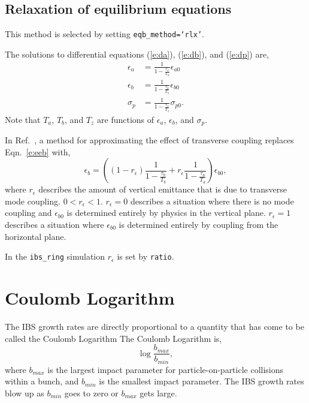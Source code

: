 \documentclass[11pt]{article}
\begin{document}
\subsection{Relaxation of equilibrium equations}
\label{ss:rlx}

This method is selected by setting {\tt eqb_method=`rlx'}.

The solutions to differential equations (\ref{e:da}), (\ref{e:db}), and (\ref{e:dp}) are,
\begin{align}
\epsilon_a&=\frac{1}{1-\frac{\tau_a}{T_a}}\epsilon_{a0}\label{e:eea}\\
\epsilon_b&=\frac{1}{1-\frac{\tau_b}{T_b}}\epsilon_{b0}\label{e:eeb}\\
\sigma_p&=\frac{1}{1-\frac{\tau_z}{T_z}}\sigma_{p0}\label{e:eep}.
\end{align}
Note that $T_a$, $T_b$, and $T_z$ are functions of $\epsilon_a$, $\epsilon_b$, and $\sigma_p$.

In Ref.~\cite{b:wolski}, a method for approximating the effect of 
transverse coupling replaces Eqn.~\ref{e:eeb} with,
\begin{equation}
\epsilon_b=\left(\left(1-r_\epsilon\right)\frac{1}{1-\frac{\tau_b}{T_b}}+
r_\epsilon\frac{1}{1-\frac{\tau_a}{T_a}}\right)\epsilon_{b0},
\end{equation}
where $r_\epsilon$ describes the amount of vertical emittance that is due to transverse mode coupling.
$0<r_\epsilon<1$.
$r_\epsilon=0$ describes a situation where there is no mode coupling and $\epsilon_{b0}$ is
determined entirely by physics in the vertical plane.  $r_\epsilon=1$ describes a situation
where $\epsilon_{b0}$ is determined entirely by coupling from the horizontal plane.

In the {\tt ibs\_ring} simulation $r_\epsilon$ is set by {\tt ratio}.

\section{Coulomb Logarithm}
The IBS growth rates are directly proportional to a quantity that has come to be called
the Coulomb Logarithm
The Coulomb Logarithm is,
\begin{equation}
\log\frac{b_{max}}{b_{min}},
\end{equation}
where $b_{max}$ is the largest impact parameter for particle-on-particle collisions
within a bunch, and $b_{min}$ is the smallest impact parameter.  The IBS growth rates
blow up as $b_{min}$ goes to zero or $b_{max}$ gets large.
\end{document}
